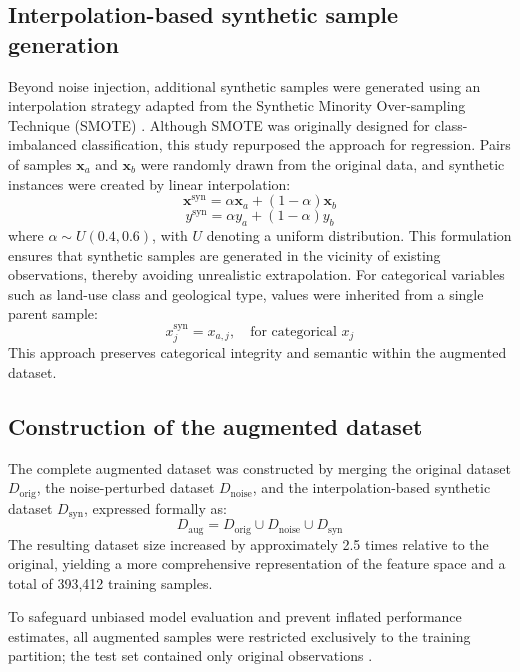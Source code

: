 \documentclass[oneside,doublespacing,flushright]{lsuthesis}
\begin{document}
\subsection{Interpolation-based synthetic sample generation}
Beyond noise injection, additional synthetic samples were generated using an interpolation strategy adapted from the Synthetic Minority Over-sampling Technique (SMOTE) \citep{Chawla2002}. Although SMOTE was originally designed for class-imbalanced classification, this study repurposed the approach for regression. Pairs of samples $\mathbf{x}_a$ and $\mathbf{x}_b$ were randomly drawn from the original data, and synthetic instances were created by linear interpolation:
\begin{equation}
\mathbf{x}^{\text{syn}} = \alpha \mathbf{x}_a + (1 - \alpha)\mathbf{x}_b
\end{equation}
\begin{equation}
y^{\text{syn}} = \alpha y_a + (1 - \alpha)y_b
\end{equation}
where $\alpha \sim U(0.4, 0.6)$, with $U$ denoting a uniform distribution. This formulation ensures that synthetic samples are generated in the vicinity of existing observations, thereby avoiding unrealistic extrapolation. For categorical variables such as land-use class and geological type, values were inherited from a single parent sample:
\begin{equation}
x_j^{\text{syn}} = x_{a,j}, \quad \text{for categorical } x_j
\end{equation}
This approach preserves categorical integrity and semantic within the augmented dataset.

\subsection{Construction of the augmented dataset}
The complete augmented dataset was constructed by merging the original dataset $D_{\text{orig}}$, the noise-perturbed dataset $D_{\text{noise}}$, and the interpolation-based synthetic dataset $D_{\text{syn}}$, expressed formally as:
\begin{equation}
D_{\text{aug}} = D_{\text{orig}} \cup D_{\text{noise}} \cup D_{\text{syn}}
\end{equation}
The resulting dataset size increased by approximately 2.5 times relative to the original, yielding a more comprehensive representation of the feature space and a total of 393,412 training samples.


To safeguard unbiased model evaluation and prevent inflated performance estimates, all augmented samples were restricted exclusively to the training partition; the test set contained only original observations \citep{Kaufman2012}.
\end{document}
